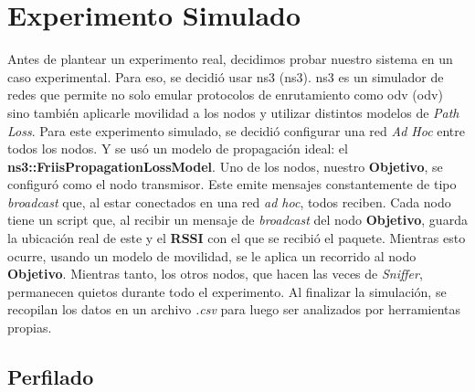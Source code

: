 \chapter{Experimento Simulado}
\label{Capitulo_3}
\label{ExperimentoSimulado}
Antes de plantear un experimento real, decidimos probar nuestro sistema en un caso experimental. Para eso, se decidió usar \acs{ns3} (\acl{ns3}). \acs{ns3} es un simulador de redes que permite no solo emular protocolos de enrutamiento como \acs{odv} (\acl{odv}) sino también aplicarle movilidad a los nodos y utilizar distintos modelos de \textit{Path Loss}.
Para este experimento simulado, se decidió configurar una red \textit{Ad Hoc} entre todos los nodos. Y se usó un modelo de propagación ideal: el \textbf{ns3::FriisPropagationLossModel}.
Uno de los nodos, nuestro \textbf{Objetivo}, se configuró como el nodo transmisor. Este emite mensajes constantemente de tipo \textit{broadcast} que, al estar conectados en una red \textit{ad hoc}, todos reciben.
Cada nodo tiene un script que, al recibir un mensaje de \textit{broadcast} del nodo \textbf{Objetivo}, guarda la ubicación real de este y el \textbf{RSSI} con el que se recibió el paquete.
Mientras esto ocurre, usando un modelo de movilidad, se le aplica un recorrido al nodo \textbf{Objetivo}. Mientras tanto, los otros nodos, que hacen las veces de \textit{Sniffer}, permanecen quietos durante todo el experimento. Al finalizar la simulación, se recopilan los datos en un archivo \textit{.csv} para luego ser analizados por herramientas propias.
\section{Perfilado}
